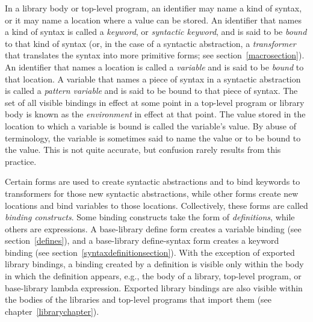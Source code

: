 In a library body or top-level program,
an identifier may name a kind of syntax, or it may name
a location where a value can be stored.  An identifier that names a kind
of syntax is called a {\em keyword}, or {\em syntactic keyword},
and is said to be {\em bound} to that kind of syntax (or, in the case of a
syntactic abstraction, a {\em transformer} that translates the syntax into more
primitive forms; see section~\ref{macrosection}).  An identifier that names a
location is called a {\em variable} and is said to be
{\em bound} to that location.  
A variable that names a piece of syntax in a syntactic abstraction is
called a \textit{pattern variable} and is said
to be bound to that piece of syntax.
The set of all visible
bindings in effect at some point in a top-level program or
library body is
known as the {\em environment} in effect at that point.  The value
stored in the location to which a variable is bound is called the
variable's value.  By abuse of terminology, the variable is sometimes
said to name the value or to be bound to the value.  This is not quite
accurate, but confusion rarely results from this practice.



\vest Certain forms are used to create syntactic abstractions
and to bind keywords to transformers for those new syntactic abstractions, while other
forms create new locations and bind variables to those
locations.  Collectively, these forms are called {\em binding
  constructs}.
Some binding constructs take the form of
\textit{definitions}, while others are
expressions.
A base-library {\cf define} form creates a variable binding (see
section~\ref{defines}), and a base-library {\cf define-syntax} form
creates a keyword binding (see section~\ref{syntaxdefinitionsection}).
With the exception of exported library bindings, a binding created
by a definition is visible only within the body in which the
definition appears, e.g., the body of a library, top-level program,
or base-library {\cf lambda} expression.
Exported library bindings are also visible within the bodies of
the libraries and top-level programs that import them (see
chapter~\ref{librarychapter}).

